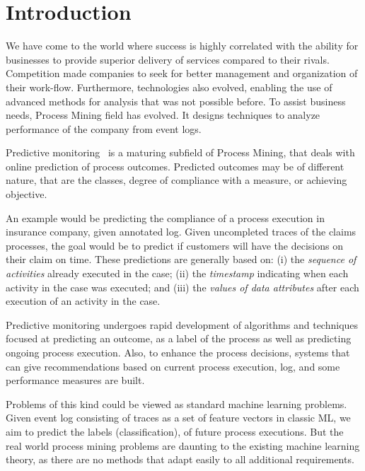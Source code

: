 

\section{Introduction} %
\label{sec:introduction}


We have come to the world where success is highly correlated with the ability for businesses to provide superior  delivery of services compared to their rivals. Competition made companies to seek for better management and organization of their work-flow. Furthermore, technologies also evolved, enabling the use of advanced methods for analysis that was not possible before. To assist business needs, Process Mining field has evolved. It designs techniques to analyze performance of the company from event logs.  

Predictive monitoring~\cite{Maggi:CAiSE2014} is a maturing subfield of Process Mining, that deals with online prediction of process outcomes. Predicted outcomes may be of different nature, that are the classes, degree of compliance with a measure, or achieving objective.

An example would be predicting the compliance of a process execution in insurance company, given annotated log. Given uncompleted traces of the claims processes, the goal would be to predict if customers will have the decisions on their claim on time. These predictions are generally based on: (i) the \emph{sequence of activities} already executed in the case; (ii) the \emph{timestamp} indicating when each activity in the case was executed; and (iii) the \emph{values of data attributes} after each execution of an activity in the case.



Predictive monitoring undergoes rapid development of algorithms and techniques focused at predicting an outcome, as a label of the process as well as predicting ongoing process execution. Also, to enhance the process decisions, systems that can give recommendations based on current process execution, log, and some performance measures are built. 

Problems of this kind could be viewed as standard machine learning problems. Given event log consisting of traces as a set of feature vectors in classic ML, we aim to predict the labels (classification), of future process executions. But the real world process mining problems are daunting to the existing machine learning theory, as there are no methods that adapt easily to all additional requirements. 

